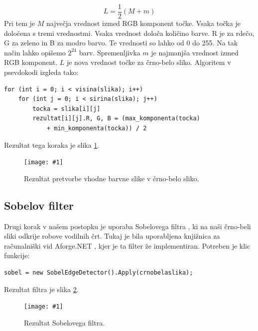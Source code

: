 \documentclass[oneside, a4paper, 12pt]{book}
\newcommand{\slika}[3]{
	\begin{figure}
	\begin{center}
	\texttt{[image: \#1]}
	\end{center}
	\vspace{-20pt}
	\caption{#2}
	\label{#3}
	\end{figure}
}
\begin{document}
\begin{equation}
L=\dfrac{1}{2}(M+m)
\label{eq:bw}
\end{equation}
Pri tem je $M$ največja vrednost izmed RGB \cite{RGB} komponent točke. 
Vsaka točka je določena s tremi vrednostmi. Vsaka vrednost določa 
količino barve. R je za rdečo, G za zeleno in B za modro barvo. Te 
vrednosti so lahko od 0 do 255. Na tak način lahko opišemo $2^{24}$ 
barv. Spremenljivka $m$ je najmanjša vrednost izmed RGB komponent. 
$L$ je nova vrednost točke za črno-belo sliko. Algoritem v psevdokodi 
izgleda tako:
\begin{samepage}
\begin{verbatim}
for (int i = 0; i < visina(slika); i++)
    for (int j = 0; i < sirina(slika); j++)
	    tocka = slika[i][j]
	    rezultat[i][j].R, G, B = (max_komponenta(tocka) 
	        + min_komponenta(tocka)) / 2
\end{verbatim}
\end{samepage}
Rezultat tega koraka je slika \ref{pic:bw}.



\slika{slike/crno-bela-slika.jpg}{Rezultat pretvorbe vhodne barvne 
slike v črno-belo sliko.}{pic:bw}

\subsection{Sobelov filter}
\label{ch:sobel}
Drugi korak v našem postopku je uporaba Sobelovega filtra 
\cite{sobel-wiki}, ki na naši črno-beli sliki odkrije robove 
vodilnih črt. Tukaj je bila uporabljena knjižnica za računalniški 
vid Aforge.NET \cite{sobel}, kjer je ta filter že implementiran. Potreben 
je klic funkcije:
\begin{samepage}
\begin{verbatim}
sobel = new SobelEdgeDetector().Apply(crnobelaslika);
\end{verbatim}
\end{samepage}
Rezultat filtra je slika \ref{pic:sobel}.

\slika{slike/sobel.jpg}{Rezultat Sobelovega filtra.}{pic:sobel}
\end{document}
